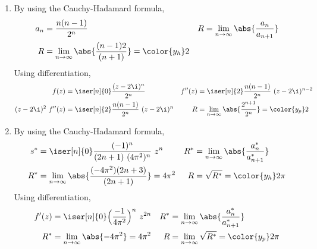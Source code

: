 \begin{enumerate}
    \item By using the Cauchy-Hadamard formula,
          \begin{align}
              a_n & = \frac{n(n-1)}{2^n}                             &
              R   & = \lim_{n \to \infty} \abs{\frac{a_n}{a_{n+1}}}    \\
              R   & = \lim_{n \to \infty} \abs{\frac{(n-1)2}{(n+1)}}
              = \color{y_h} 2
          \end{align}
          Using differentiation,
          \begin{align}
              f(z)                & = \iser[n]{0} \frac{(z-2\i)^n}{2^n}             &
              f''(z)              & = \iser[n]{2} \frac{n(n-1)}{2^n}\ (z-2\i)^{n-2}   \\
              (z - 2\i)^2\ f''(z) & = \iser[n]{2} \frac{n(n-1)}{2^n}\ (z-2\i)^{n}   &
              R                   & = \lim_{n \to \infty} \abs{\frac{2^{n+1}}{2^n}}
              = \color{y_p} 2
          \end{align}

    \item By using the Cauchy-Hadamard formula,
          \begin{align}
              s^*                & = \iser[n]{0} \frac{(-1)^n}{(2n+1)\ (4\pi^2)^n}
              \ z^n              &
              R^*                & = \lim_{n \to \infty} \abs{\frac{a^*_n}{a^*_{n+1}}} \\
              R^*                & = \lim_{n \to \infty} \abs{\frac{(-4\pi^2)(2n+3)}
              {(2n+1)}} = 4\pi^2 &
              R                  & = \sqrt{R^*} = \color{y_h} 2\pi
          \end{align}
          Using differentiation,
          \begin{align}
              f'(z)    & = \iser[n]{0} \Big(\frac{-1}{4\pi^2}\Big)^n
              \ z^{2n} &
              R^*      & = \lim_{n \to \infty} \abs{\frac{a^*_n}
              {a^*_{n+1}}}                                                     \\
              R^*      & = \lim_{n \to \infty} \abs{-4\pi^2} = 4\pi^2        &
              R        & = \lim_{n \to \infty} \sqrt{R^*} = \color{y_p} 2\pi
          \end{align}


\end{enumerate}
